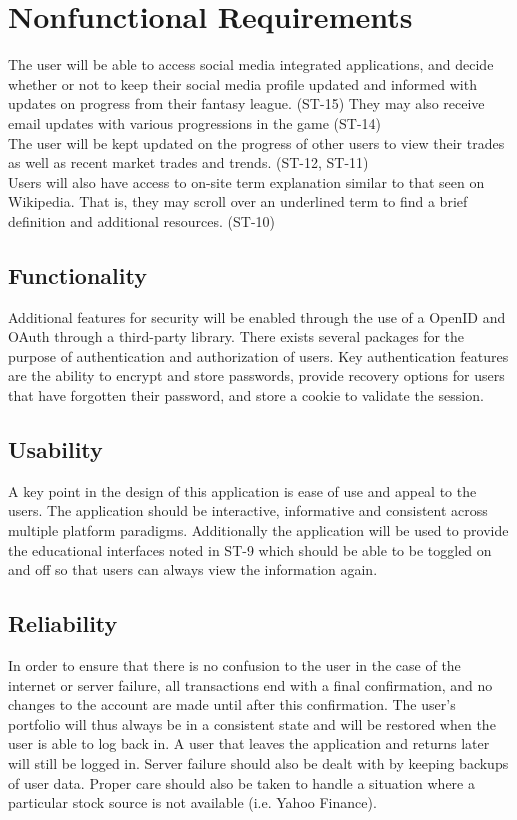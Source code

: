 \section{Nonfunctional Requirements}

The user will be able to access social media integrated applications, and decide whether
or not to keep their social media profile updated and informed with updates on progress from
their fantasy league. (ST-15) They may also receive email updates with various progressions in
the game (ST-14)\\

The user will be kept updated on the progress of other users to view their trades as well as
recent market trades and trends. (ST-12, ST-11)\\

Users will also have access to on-site term explanation similar to that seen on Wikipedia.
That is, they may scroll over an underlined term to find a brief definition and additional
resources. (ST-10)\\


\subsection{Functionality}
Additional features for security will be enabled through the use of a
OpenID and OAuth through a third-party library. There exists several packages
for the purpose of authentication and authorization of users. Key authentication
features are the ability to encrypt and store passwords, provide recovery
options for users that have forgotten their password, and store a cookie to
validate the session.


\subsection{Usability}
A key point in the design of this application is ease of use and appeal to the
users. The application should be interactive, informative and consistent across
multiple platform paradigms. Additionally the application will be used to
provide the educational interfaces noted in ST-9 which should be able to be
toggled on and off so that users can always view the information again.


\subsection{Reliability}
In order to ensure that there is no confusion to the user in the case of the
internet or server failure, all transactions end with a final confirmation, and
no changes to the account are made until after this confirmation. The user's
portfolio will thus always be in a consistent state and will be restored when
the user is able to log back in. A user that leaves the application and returns
later will still be logged in. Server failure should also be dealt with by
keeping backups of user data.  Proper care should also be taken to handle a
situation where a particular stock source is not available (i.e. Yahoo Finance).


